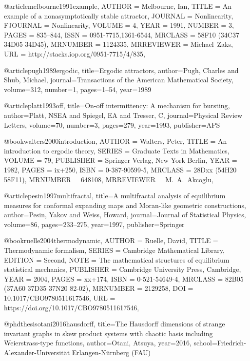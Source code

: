 @article{melbourne1991example,
    AUTHOR = {Melbourne, Ian},
     TITLE = {An example of a nonasymptotically stable attractor},
   JOURNAL = {Nonlinearity},
  FJOURNAL = {Nonlinearity},
    VOLUME = {4},
      YEAR = {1991},
    NUMBER = {3},
     PAGES = {835--844},
      ISSN = {0951-7715,1361-6544},
   MRCLASS = {58F10 (34C37 34D05 34D45)},
  MRNUMBER = {1124335},
MRREVIEWER = {Michael\ Zaks},
       URL = {http://stacks.iop.org/0951-7715/4/835},
}

@article{pugh1989ergodic,
  title={Ergodic attractors},
  author={Pugh, Charles and Shub, Michael},
  journal={Transactions of the American Mathematical Society},
  volume={312},
  number={1},
  pages={1--54},
  year={1989}
}

@article{platt1993off,
  title={On-off intermittency: A mechanism for bursting},
  author={Platt, NSEA and Spiegel, EA and Tresser, C},
  journal={Physical Review Letters},
  volume={70},
  number={3},
  pages={279},
  year={1993},
  publisher={APS}
}


@book{walters2000introduction,
    AUTHOR = {Walters, Peter},
     TITLE = {An introduction to ergodic theory},
    SERIES = {Graduate Texts in Mathematics},
    VOLUME = {79},
 PUBLISHER = {Springer-Verlag, New York-Berlin},
      YEAR = {1982},
     PAGES = {ix+250},
      ISBN = {0-387-90599-5},
   MRCLASS = {28Dxx (54H20 58F11)},
  MRNUMBER = {648108},
MRREVIEWER = {M.\ A.\ Akcoglu},
}



@article{pesin1997multifractal,
  title={A multifractal analysis of equilibrium measures for conformal expanding maps and Moran-like geometric constructions},
  author={Pesin, Yakov and Weiss, Howard},
  journal={Journal of Statistical Physics},
  volume={86},
  pages={233--275},
  year={1997},
  publisher={Springer}
}

@book{ruelle2004thermodynamic,
    AUTHOR = {Ruelle, David},
     TITLE = {Thermodynamic formalism},
    SERIES = {Cambridge Mathematical Library},
   EDITION = {Second},
      NOTE = {The mathematical structures of equilibrium statistical
              mechanics},
 PUBLISHER = {Cambridge University Press, Cambridge},
      YEAR = {2004},
     PAGES = {xx+174},
      ISBN = {0-521-54649-4},
   MRCLASS = {82B05 (37A60 37D35 37N20 82-02)},
  MRNUMBER = {2129258},
       DOI = {10.1017/CBO9780511617546},
       URL = {https://doi.org/10.1017/CBO9780511617546},
}

@phdthesis{otani2016hausdorff,
  title={The Hausdorff dimensions of strange invariant graphs in skew product systems with chaotic basis including Weierstrass-type functions},
  author={Otani, Atsuya},
  year={2016},
  school={Friedrich-Alexander-Universit{\"a}t Erlangen-N{\"u}rnberg (FAU)}
}

